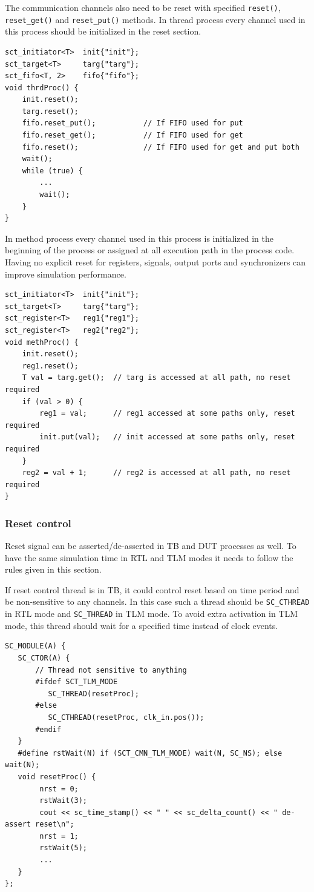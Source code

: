 The communication channels also need to be reset with specified {\tt reset()}, {\tt reset\_get()} and {\tt reset\_put()} methods. In thread process every channel used in this process should be initialized in the reset section.
\begin{lstlisting}[style=mycpp]
sct_initiator<T>  init{"init"};
sct_target<T>     targ{"targ"};
sct_fifo<T, 2>    fifo{"fifo"};
void thrdProc() {
    init.reset();
    targ.reset();
    fifo.reset_put();           // If FIFO used for put
    fifo.reset_get();           // If FIFO used for get
    fifo.reset();               // If FIFO used for get and put both
    wait();
    while (true) {
        ...
        wait(); 
    } 
}
\end{lstlisting}

In method process every channel used in this process is initialized in the beginning of the process or assigned at all execution path in the process code. Having no explicit reset for registers, signals, output ports and synchronizers can improve simulation performance.
\begin{lstlisting}[style=mycpp]
sct_initiator<T>  init{"init"};
sct_target<T>     targ{"targ"};
sct_register<T>   reg1{"reg1"};
sct_register<T>   reg2{"reg2"};
void methProc() {
    init.reset();
    reg1.reset();        
    T val = targ.get();  // targ is accessed at all path, no reset required
    if (val > 0) {
        reg1 = val;      // reg1 accessed at some paths only, reset required
        init.put(val);   // init accessed at some paths only, reset required
    }
    reg2 = val + 1;      // reg2 is accessed at all path, no reset required 
}
\end{lstlisting}


\subsubsection{Reset control}
Reset signal can be asserted/de-asserted in TB and DUT processes as well. To have the same simulation time in RTL and TLM modes it needs to follow the rules given in this section.

If reset control thread is in TB, it could control reset based on time period and be non-sensitive to any channels. In this case such a thread should be {\tt SC\_CTHREAD} in RTL mode and {\tt SC\_THREAD} in TLM mode. To avoid extra activation in TLM mode, this thread should wait for a specified time instead of clock events.
\begin{lstlisting}[style=mycpp]
SC_MODULE(A) {
   SC_CTOR(A) {
       // Thread not sensitive to anything
       #ifdef SCT_TLM_MODE
          SC_THREAD(resetProc);
       #else
          SC_CTHREAD(resetProc, clk_in.pos());
       #endif
   }
   #define rstWait(N) if (SCT_CMN_TLM_MODE) wait(N, SC_NS); else wait(N);
   void resetProc() {
        nrst = 0; 
        rstWait(3);
        cout << sc_time_stamp() << " " << sc_delta_count() << " de-assert reset\n";
        nrst = 1; 
        rstWait(5);
        ...
   } 
};
\end{lstlisting}

